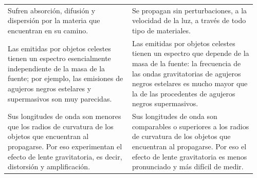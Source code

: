 {\begin{longtable}{@{}>{\raggedright\arraybackslash}p{0.48\linewidth}>{\raggedright\arraybackslash}p{0.48\linewidth}@{}}
Sufren absorción, difusión y dispersión por la materia que encuentran en su camino.
&
Se propagan sin perturbaciones, a la velocidad de la luz, a través de todo tipo de materiales.
\\[6pt]
Las emitidas por objetos celestes tienen un espectro\index{espectro!electromagnético} esencialmente independiente de la masa de la fuente; por ejemplo, las emisiones de agujeros negros estelares y supermasivos son muy parecidas.
&
Las emitidas por objetos celestes tienen un espectro que depende de la masa de la fuente: la frecuencia de las ondas gravitatorias\index{espectro!ondas gravitatorias} de agujeros negros estelares es mucho mayor que la de las procedentes de agujeros negros supermasivos.
\\[6pt]
Sus longitudes de onda son menores que los radios de curvatura de los objetos que encuentran al propagarse. Por eso experimentan el efecto de lente gravitatoria\index{gravitatorio!efecto de lente}, es decir, distorsión y amplificación.
&
Sus longitudes de onda son comparables o superiores a los radios de curvatura de los objetos que encuentran al propagarse. Por eso el efecto de lente gravitatoria es menos pronunciado y más difícil de medir.
\\[6pt]
\bottomrule
\end{longtable}
}
